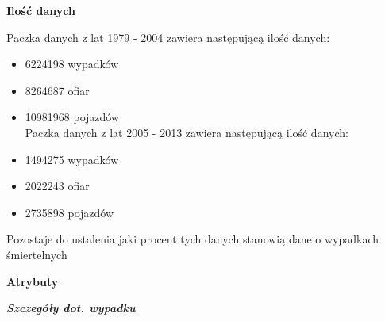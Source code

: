 \textbf{Ilość danych}

Paczka danych z lat 1979 - 2004 zawiera następującą ilość danych:

\begin{itemize}
\itemsep-14pt\parskip0pt
\item
  6224198 wypadków\\
\item
  8264687 ofiar\\
\item
  10981968 pojazdów\\Paczka danych z lat 2005 - 2013 zawiera następującą
  ilość danych:\\
\item
  1494275 wypadków\\
\item
  2022243 ofiar\\
\item
  2735898 pojazdów
\end{itemize}

Pozostaje do ustalenia jaki procent tych danych stanowią dane o
wypadkach śmiertelnych

\textbf{Atrybuty}

\textbf{\emph{Szczegóły dot. wypadku}}

